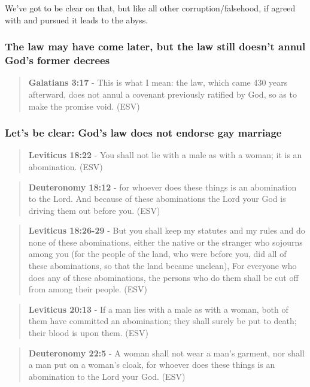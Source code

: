 \documentclass[11pt]{article}
\begin{document}
We've got to be clear on that, but like all other corruption/falsehood, if agreed with and pursued it leads to the abyss.

\subsubsection{The law may have come later, but the law still doesn't annul God's former decrees}
\label{sec:org2f60166}
\begin{quote}
\textbf{Galatians 3:17} - This is what I mean: the law, which came 430 years afterward, does not annul a covenant previously ratified by God, so as to make the promise void. (ESV)
\end{quote}

\subsubsection{Let's be clear: God's law does not endorse gay marriage}
\label{sec:org28e5749}
\begin{quote}
\textbf{Leviticus 18:22} - You shall not lie with a male as with a woman; it is an abomination. (ESV)
\end{quote}

\begin{quote}
\textbf{Deuteronomy 18:12} - for whoever does these things is an abomination to the Lord. And because of these abominations the Lord your God is driving them out before you. (ESV)
\end{quote}

\begin{quote}
\textbf{Leviticus 18:26-29} - But you shall keep my statutes and my rules and do none of these abominations, either the native or the stranger who sojourns among you (for the people of the land, who were before you, did all of these abominations, so that the land became unclean), For everyone who does any of these abominations, the persons who do them shall be cut off from among their people. (ESV)
\end{quote}

\begin{quote}
\textbf{Leviticus 20:13} - If a man lies with a male as with a woman, both of them have committed an abomination; they shall surely be put to death; their blood is upon them. (ESV)
\end{quote}

\begin{quote}
\textbf{Deuteronomy 22:5} - A woman shall not wear a man's garment, nor shall a man put on a woman's cloak, for whoever does these things is an abomination to the Lord your God. (ESV)
\end{quote}
\end{document}

